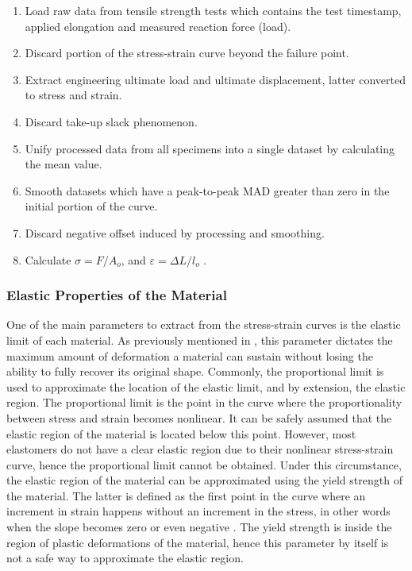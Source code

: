  \begin{enumerate}[noitemsep] %
    \item Load raw data from tensile strength tests which contains the test timestamp, applied elongation and measured reaction force (load).
    \item Discard portion of the stress-strain curve beyond the failure point.
    \item Extract engineering ultimate load and ultimate displacement, latter converted to stress and strain.
    \item Discard take-up slack phenomenon.
    \item Unify processed data from all specimens into a single dataset by calculating the mean value.
    \item Smooth datasets which have a peak-to-peak MAD greater than zero in the initial portion of the curve.
    \item Discard negative offset induced by processing and smoothing.
    \item Calculate $\sigma = F/A_o$, and $\varepsilon=\Delta L/l_o$ .
\end{enumerate}

\subsubsection{Elastic Properties of the Material} \label{sss:elasticProperties}

One of the main parameters to extract from the stress-strain curves is the elastic limit of each material. As previously mentioned in , this parameter dictates the maximum amount of deformation a material can sustain without losing the ability to fully recover its original shape. Commonly, the proportional limit is used to approximate the location of the elastic limit, and by extension, the elastic region. The proportional limit is the point in the curve where the proportionality between stress and strain becomes nonlinear. It can be safely assumed that the elastic region of the material is located below this point. However, most elastomers do not have a clear elastic region due to their nonlinear stress-strain curve, hence the proportional limit cannot be obtained. Under this circumstance, the elastic region of the material can be approximated using the yield strength of the material. The latter is defined as the first point in the curve where an increment in strain happens without an increment in the stress, in other words when the slope becomes zero or even negative \cite{astmd638}. The yield strength is inside the region of plastic deformations of the material, hence this parameter by itself is not a safe way to approximate the elastic region. 

